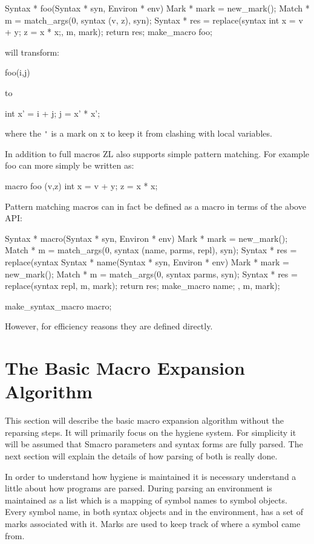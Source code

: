 \documentclass[12pt,english,letterpaper]{article}
\begin{document}
\begin{code}
Syntax * foo(Syntax * syn, Environ * env) {
  Mark * mark = new_mark();
  Match * m = match_args(0, syntax (v, z), syn);
  Syntax * res = replace(syntax {int x = v + y; z = x * x;}, m, mark);
  return res;
}
make_macro foo;
\end{code}

will transform:
\begin{code}
foo(i,j)
\end{code}
to
\begin{code}
int x' = i + j;
j = x' * x';
\end{code}
where the \verb/'/ is a mark on x to keep it from clashing with local variables.

In addition to full macros ZL also supports simple pattern matching.
For example foo can more simply be written as:

\begin{code}
macro foo (v,z) {
  int x = v + y; 
  z = x * x;
}
\end{code}

Pattern matching macros can in fact be defined as a macro in terms of
the above API:

\begin{code}
Syntax * macro(Syntax * syn, Environ * env) {
  Mark * mark = new_mark();
  Match * m = match_args(0, syntax (name, parms, repl), syn);
  Syntax * res = replace(syntax {
      Syntax * name(Syntax * syn, Environ * env) {
        Mark * mark = new_mark();
        Match * m = match_args(0, syntax parms, syn);
        Syntax * res = replace(syntax repl, m, mark);
        return res;
      }
      make_macro name;
    }, m, mark);
}

make_syntax_macro macro;
\end{code}

However, for efficiency reasons they are defined directly.

\section{The Basic Macro Expansion Algorithm}

This section will describe the basic macro expansion algorithm without
the reparsing steps.  It will primarily focus on the hygiene system.
For simplicity it will be assumed that Smacro parameters and syntax
forms are fully parsed.  The next section will explain the details of
how parsing of both is really done.  

In order to understand how hygiene is maintained it is necessary
understand a little about how programs are parsed.  During parsing an
environment is maintained as a list which is a mapping of symbol names
to symbol objects.  Every symbol name, in both syntax objects and in
the environment, has a set of marks associated with it.  Marks are
used to keep track of where a symbol came from.
\end{document}
